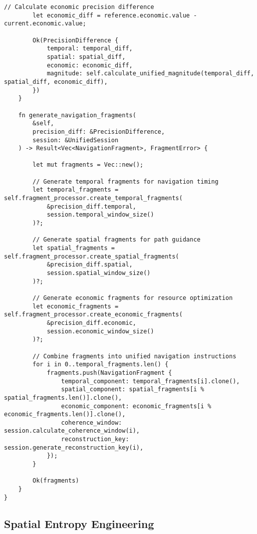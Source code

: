 \documentclass[12pt,a4paper]{article}
\begin{document}
\begin{lstlisting}[style=ruststyle, caption=Spatio-Temporal Navigation Engine]
        // Calculate economic precision difference
        let economic_diff = reference.economic.value - current.economic.value;
        
        Ok(PrecisionDifference {
            temporal: temporal_diff,
            spatial: spatial_diff,
            economic: economic_diff,
            magnitude: self.calculate_unified_magnitude(temporal_diff, spatial_diff, economic_diff),
        })
    }
    
    fn generate_navigation_fragments(
        &self,
        precision_diff: &PrecisionDifference,
        session: &UnifiedSession
    ) -> Result<Vec<NavigationFragment>, FragmentError> {
        
        let mut fragments = Vec::new();
        
        // Generate temporal fragments for navigation timing
        let temporal_fragments = self.fragment_processor.create_temporal_fragments(
            &precision_diff.temporal,
            session.temporal_window_size()
        )?;
        
        // Generate spatial fragments for path guidance
        let spatial_fragments = self.fragment_processor.create_spatial_fragments(
            &precision_diff.spatial,
            session.spatial_window_size()
        )?;
        
        // Generate economic fragments for resource optimization
        let economic_fragments = self.fragment_processor.create_economic_fragments(
            &precision_diff.economic,
            session.economic_window_size()
        )?;
        
        // Combine fragments into unified navigation instructions
        for i in 0..temporal_fragments.len() {
            fragments.push(NavigationFragment {
                temporal_component: temporal_fragments[i].clone(),
                spatial_component: spatial_fragments[i % spatial_fragments.len()].clone(),
                economic_component: economic_fragments[i % economic_fragments.len()].clone(),
                coherence_window: session.calculate_coherence_window(i),
                reconstruction_key: session.generate_reconstruction_key(i),
            });
        }
        
        Ok(fragments)
    }
}
\end{lstlisting}

\subsection{Spatial Entropy Engineering}
\end{document}
